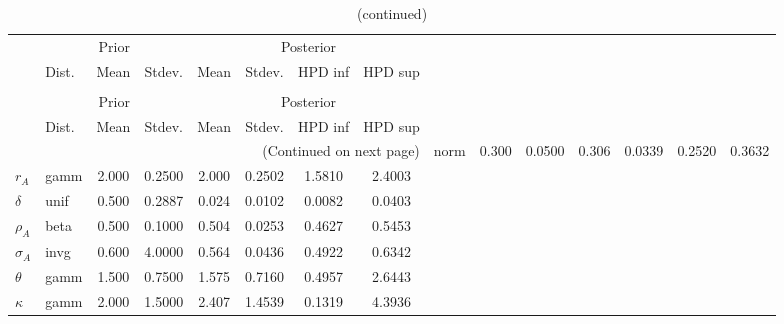  
\begin{center}
\begin{longtable}{llcccccc} 
\caption{Results from Metropolis-Hastings (parameters)}
 \label{Table:MHPosterior:1}\\
\toprule 
  & \multicolumn{3}{c}{Prior}  &  \multicolumn{4}{c}{Posterior} \\
  \cmidrule(r{.75em}){2-4} \cmidrule(r{.75em}){5-8}
  & Dist. & Mean  & Stdev. & Mean & Stdev. & HPD inf & HPD sup\\
\midrule \endfirsthead 
\caption{(continued)}\\\toprule 
  & \multicolumn{3}{c}{Prior}  &  \multicolumn{4}{c}{Posterior} \\
  \cmidrule(r{.75em}){2-4} \cmidrule(r{.75em}){5-8}
  & Dist. & Mean  & Stdev. & Mean & Stdev. & HPD inf & HPD sup\\
\midrule \endhead 
\bottomrule \multicolumn{8}{r}{(Continued on next page)} \endfoot 
\bottomrule \endlastfoot 
${\alpha}$ & norm &   0.300 & 0.0500 &   0.306& 0.0339 &  0.2520 &  0.3632 \\ 
${r_{A}}$ & gamm &   2.000 & 0.2500 &   2.000& 0.2502 &  1.5810 &  2.4003 \\ 
${\delta}$ & unif &   0.500 & 0.2887 &   0.024& 0.0102 &  0.0082 &  0.0403 \\ 
${\rho_A}$ & beta &   0.500 & 0.1000 &   0.504& 0.0253 &  0.4627 &  0.5453 \\ 
${\sigma_A}$ & invg &   0.600 & 4.0000 &   0.564& 0.0436 &  0.4922 &  0.6342 \\ 
${\theta}$ & gamm &   1.500 & 0.7500 &   1.575& 0.7160 &  0.4957 &  2.6443 \\ 
${\kappa}$ & gamm &   2.000 & 1.5000 &   2.407& 1.4539 &  0.1319 &  4.3936 \\ 
\end{longtable}
 \end{center}
